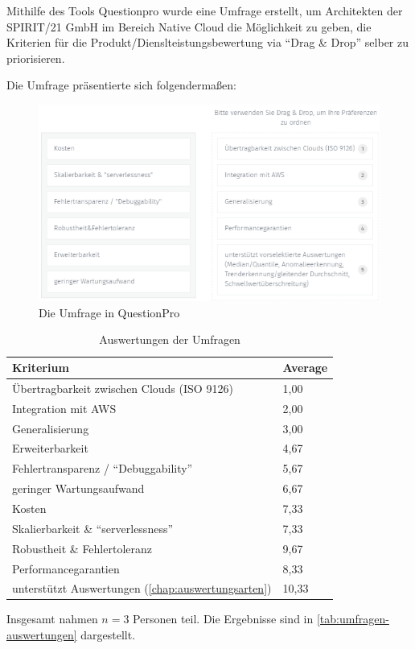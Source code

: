 \label{anhang:umfrage}
Mithilfe des Tools Questionpro wurde eine Umfrage erstellt, um Architekten der SPIRIT/21 GmbH im Bereich Native Cloud die Möglichkeit zu geben, die Kriterien für die Produkt/Dienslteistungsbewertung via \enquote{Drag \& Drop} selber zu priorisieren.

Die Umfrage präsentierte sich folgendermaßen:

\begin{figure}[H]
\centering
\includegraphics[width=\textwidth]{graphics/Umfrage-Darstellung.png}
\caption{Die Umfrage in QuestionPro}
\label{abb:Umfrage}
\end{figure}


\begin{table}[H]
\centering
\begin{tabular}{|l|l|}
\hline
Kriterium & Average \\ \hline
Übertragbarkeit zwischen Clouds (ISO 9126) & 1,00 \\ \hline
Integration mit AWS & 2,00 \\ \hline
Generalisierung & 3,00 \\ \hline
Erweiterbarkeit & 4,67 \\ \hline
Fehlertransparenz / \enquote{Debuggability} & 5,67 \\ \hline
geringer Wartungsaufwand & 6,67 \\ \hline
Kosten & 7,33 \\ \hline
Skalierbarkeit  \& \enquote{serverlessness} & 7,33 \\ \hline
Robustheit \& Fehlertoleranz & 9,67 \\ \hline
Performancegarantien & 8,33 \\ \hline
unterstützt Auswertungen (\autoref{chap:auswertungsarten}) & 10,33 \\ \hline
\end{tabular}
\caption{Auswertungen der Umfragen}
\label{tab:umfragen-auswertungen}
\end{table}

Insgesamt nahmen $n=3$ Personen teil. Die Ergebnisse sind in \autoref{tab:umfragen-auswertungen} dargestellt.